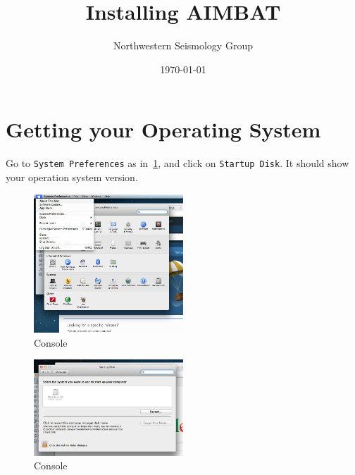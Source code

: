 \documentclass[letterpaper,10pt]{article}
\title{Installing AIMBAT}
\author{Northwestern Seismology Group}
\date{\today}
\begin{document}
\maketitle


\section{Getting your Operating System}

Go to \verb"System Preferences" as in~\ref{fig:system_preferences}, and click on \verb"Startup Disk". It should show your operation system version.

\begin{figure}[h!]
  \centering
  \includegraphics[width=0.5\textwidth]{images/system_preferences}
  \caption{Console}
  \label{fig:system_preferences}
\end{figure}

\begin{figure}[h!]
  \centering
  \includegraphics[width=0.5\textwidth]{images/startup_disk}
  \caption{Console}
  \label{fig:startup_disk}
\end{figure}
\end{document}
